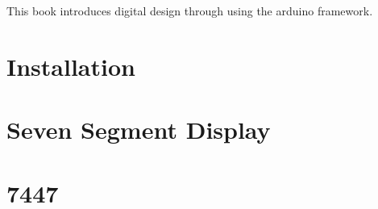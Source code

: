 \documentclass[11pt]{book}
\begin{document}

\setcounter{page}{1}

\begin{introduction}
This book introduces digital design through using the arduino framework.
\end{introduction}

\mainmatter
\chapter{Installation}

\chapter{Seven Segment Display}

\chapter{7447}

\end{document}
